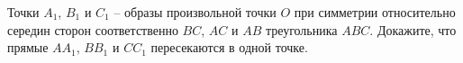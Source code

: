 \begin{ex}
	\begin{condition}
		Точки \( A_1 \), \( B_1  \) и \( C_1 \) – образы произвольной точки \( O  \) при симметрии относительно середин сторон соответственно \( BC \), \( AC  \) и \( AB  \) треугольника \( ABC \). Докажите, что
		прямые \( AA_1 \), \( BB_1 \) и \( CC_1 \) пересекаются в одной точке.
	\end{condition}
\end{ex}
